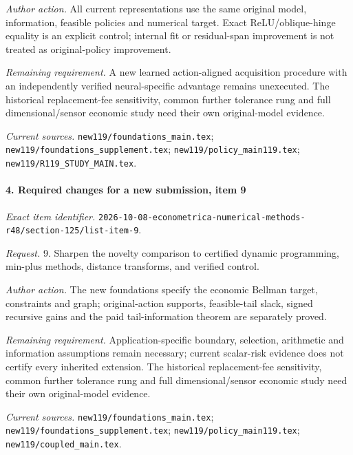 \par\emph{Author action.} All current representations use the same original model, information, feasible policies and numerical target. Exact ReLU/\allowbreak{}oblique-hinge equality is an explicit control; internal fit or residual-span improvement is not treated as original-policy improvement.

\par\emph{Remaining requirement.} A new learned action-aligned acquisition procedure with an independently verified neural-specific advantage remains unexecuted. The historical replacement-fee sensitivity, common further tolerance rung and full dimensional/\allowbreak{}sensor economic study need their own original-model evidence.

\par\emph{Current sources.} \nolinkurl{new119/foundations_main.tex}; \nolinkurl{new119/foundations_supplement.tex}; \nolinkurl{new119/policy_main119.tex}; \nolinkurl{new119/R119_STUDY_MAIN.tex}.

\paragraph{4. Required changes for a new submission, item 9}

\emph{Exact item identifier.} \nolinkurl{2026-10-08-econometrica-numerical-methods-r48/section-125/list-item-9}.

\par\emph{Request.} 9. Sharpen the novelty comparison to certified dynamic programming, min-plus methods, distance transforms, and verified control.

\par\emph{Author action.} The new foundations specify the economic Bellman target, constraints and graph; original-action supports, feasible-tail slack, signed recursive gains and the paid tail-information theorem are separately proved.

\par\emph{Remaining requirement.} Application-specific boundary, selection, arithmetic and information assumptions remain necessary; current scalar-risk evidence does not certify every inherited extension. The historical replacement-fee sensitivity, common further tolerance rung and full dimensional/\allowbreak{}sensor economic study need their own original-model evidence.

\par\emph{Current sources.} \nolinkurl{new119/foundations_main.tex}; \nolinkurl{new119/foundations_supplement.tex}; \nolinkurl{new119/policy_main119.tex}; \nolinkurl{new119/coupled_main.tex}.

